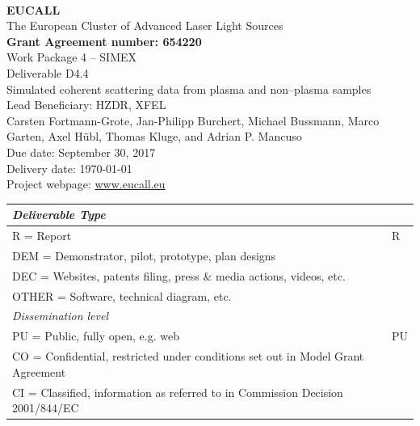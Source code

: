 \documentclass[10pt]{scrartcl}
\begin{document}
\makeatletter
\begin{titlepage}
\thispagestyle{scrheadings}
\begin{center}
$~$\\
\vspace{0cm}
{\Large\textbf{EUCALL}\\[2ex]
The European Cluster of Advanced Laser Light Sources}\\[4ex]
%
{\small\textbf{Grant Agreement number: 654220}}\\[8ex]
%
Work Package 4 -- SIMEX\\[4ex]
%
Deliverable D4.4\\
%
Simulated coherent scattering data from plasma and non--plasma samples\\[5ex]
%
Lead Beneficiary: HZDR, XFEL\\[5ex]
%
Carsten Fortmann-Grote, Jan-Philipp Burchert, Michael Bussmann,
  Marco Garten, Axel H\"ubl, Thomas Kluge,
  and Adrian P. Mancuso\\[4ex]
%
Due date: September 30, 2017\\
Delivery date: \today \\[4ex]
%
Project webpage: \url{www.eucall.eu}\\[6ex]
%
{%
\small
\begin{tabular}{|l|l|}
  \hline
  \multicolumn{2}{|l|}{ \textit{Deliverable Type} } \\
  \hline
  R = Report\hfill & R\\
  DEM = Demonstrator, pilot, prototype, plan designs & \\
  DEC = Websites, patents filing, press \& media actions, videos, etc. & \\
  OTHER = Software, technical diagram, etc. & \\
  \hline
  \multicolumn{2}{|l|}{\textit{Dissemination level}} \\
  \hline
  PU = Public, fully open, e.g. web & PU \\
  CO = Confidential, restricted under conditions set out in Model Grant
  Agreement\hspace*{17ex}\  & \\
  CI = Classified, information as referred to in Commission Decision 2001/844/EC
  & \\
  \hline
\end{tabular}
}

\end{center}
%
{}
\normalfont
\end{titlepage}
\makeatother
\end{document}
